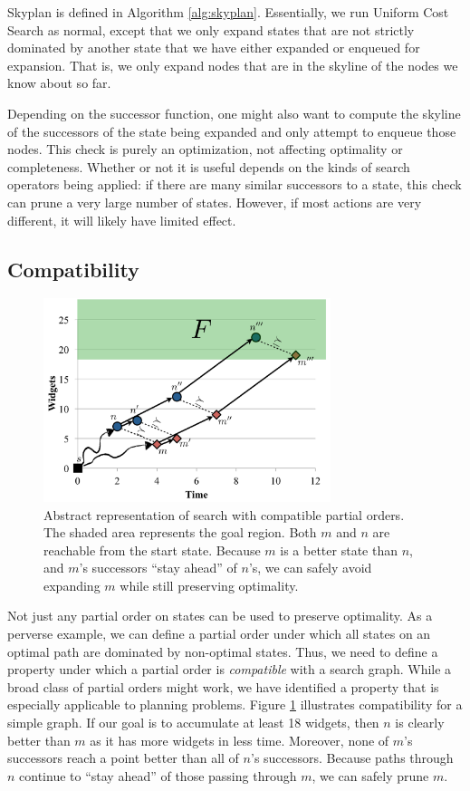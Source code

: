 \documentclass[letterpaper]{article}
\theoremstyle{plain} \newtheorem{theorem}{Theorem} \newtheorem{proposition}{Proposition} \newtheorem{lemma}{Lemma}
\theoremstyle{definition} \newtheorem{definition}{Definition} \newtheorem{conjecture}{Conjecture} \newtheorem*{example}{Example}
\theoremstyle{remark} \newtheorem*{remark}{Remark} \newtheorem*{note}{Note} \newtheorem{case}{Case}
\begin{document}
Skyplan is defined in Algorithm \ref{alg:skyplan}. Essentially, we
run Uniform Cost Search as normal, except that we only expand states
that are not strictly dominated by another state that we have either
expanded or enqueued for expansion. That is, we only expand nodes
that are in the skyline of the nodes we know about so far.

Depending on the successor function, one might also want to compute
the skyline of the successors of the state being expanded and only
attempt to enqueue those nodes.  This check is purely an optimization,
not affecting optimality or completeness. Whether or not it is
useful depends on the kinds of search operators being applied: if
there are many similar successors to a state, this check can prune a very large
number of states. However, if most actions are very different, it will
likely have limited effect.

\subsection{Compatibility}
\begin{figure}
	\begin{center}
	\includegraphics[width=3.3in]{compatibility-2.pdf}
\end{center}
  \caption{Abstract representation of search with compatible partial
  orders. The shaded area represents the goal region. Both $m$ and $n$ are reachable from the start state.
  Because $m$ is a better state than $n$, and $m$'s successors
  ``stay ahead'' of $n$'s, we can safely avoid expanding $m$ while
  still preserving optimality.}
  \label{fig:compatibility}
\end{figure}

Not just any partial order on states can be used to preserve optimality. As a perverse
example, we can define a partial order under which all states
on an optimal path
are dominated by non-optimal states. Thus, we need to define a property
under which a partial order is \textit{compatible} with a search graph. 
While a broad class of partial orders might work, we have identified
a property that is especially applicable to planning problems.
Figure \ref{fig:compatibility} illustrates 
compatibility for a simple graph. If our goal is to accumulate at
least 18 widgets, then $n$ is clearly better than $m$ as
it has more widgets in less time. Moreover, none
of $m$'s successors reach a point better than all of $n$'s 
successors. Because paths through $n$ continue to
``stay ahead'' of those passing through $m$, we
can safely prune $m$.
\end{document}
